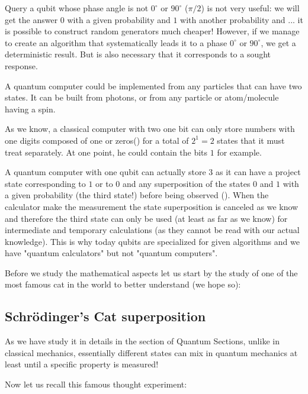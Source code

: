 	Query a qubit whose phase angle is not $0^{\circ}$ or $90^{\circ}$ ($\pi/2$) is not very useful: we will get the answer $0$ with a given probability and $1$ with another probability and ... it is possible to construct random generators much cheaper! However, if we manage to create an algorithm that systematically leads it to a phase $0^{\circ}$ or $90^{\circ}$, we get a deterministic result. But is also necessary that it corresponds to a sought response.
	
	A quantum computer could be implemented from any particles that can have two states. It can be built from photons, or from any particle or atom/molecule having a spin.
	
	As we know, a classical computer with two one bit can only store numbers with one digits composed of one or zeros() for a total of $2^1=2$ states that it must treat separately. At one point, he could contain the bits $1$ for example.
	
	A quantum computer with one qubit can actually store $3$ as it can have a project state corresponding to $1$ or to $0$ and any superposition of the states $0$ and $1$ with a given probability (the third state!) before being observed (). When the calculator make the measurement the state superposition is canceled as we know and therefore the third state can only be used (at least as far as we know) for intermediate and temporary calculations (as they cannot be read with our actual knowledge). This is why today qubits are specialized for given algorithms and we have "quantum calculators" but not "quantum computers".
	
	Before we study the mathematical aspects let us start by the study of one of the most famous cat in the world to better understand (we hope so):	
	
	\subsection{Schrödinger's Cat superposition}
	As we have study it in details in the section of Quantum Sections, unlike in classical mechanics, essentially different states can mix in
quantum mechanics at least until a specific property is measured!

	Now let us recall this famous thought experiment:
	
